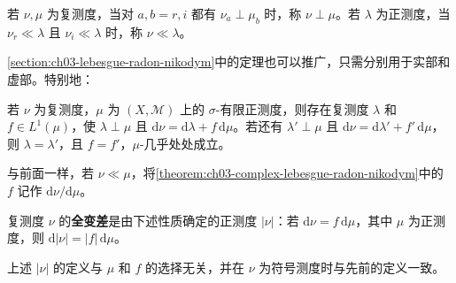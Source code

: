 \documentclass[../../main.tex]{subfiles}%
\begin{document}
\begin{definition}[复测度的奇异性与绝对连续性]\label{definition:ch03-complex-singular-absolute}
若 $\nu,\mu$ 为复测度，当对 $a,b=r,i$ 都有 $\nu_a\perp\mu_b$ 时，称 $\nu\perp\mu$。若 $\lambda$ 为正测度，当 $\nu_r\ll\lambda$ 且 $\nu_i\ll\lambda$ 时，称 $\nu\ll\lambda$。
\end{definition}
\cref{section:ch03-lebesgue-radon-nikodym}中的定理也可以推广，只需分别用于实部和虚部。特别地：
\begin{theorem}\label{theorem:ch03-complex-lebesgue-radon-nikodym}
若 $\nu$ 为复测度，$\mu$ 为 $(X,\mathscr{M})$ 上的 $\sigma$-有限正测度，则存在复测度 $\lambda$ 和 $f\in L^1(\mu)$，使 $\lambda\perp\mu$ 且 $\mathrm{d}\nu=\mathrm{d}\lambda+f\,\mathrm{d}\mu$。若还有 $\lambda'\perp\mu$ 且 $\mathrm{d}\nu=\mathrm{d}\lambda'+f'\,\mathrm{d}\mu$，则 $\lambda=\lambda'$，且 $f=f'$，$\mu$-几乎处处成立。
\end{theorem}
\begin{definition}\label{definition:ch03-complex-radon-nikodym}
与前面一样，若 $\nu\ll\mu$，将\cref{theorem:ch03-complex-lebesgue-radon-nikodym}中的 $f$ 记作 $\mathrm{d}\nu/\mathrm{d}\mu$。
\end{definition}
\begin{definition}[复测度的全变差]\label{definition:ch03-complex-total-variation}
复测度 $\nu$ 的\textbf{全变差}是由下述性质确定的正测度 $|\nu|$：若 $\mathrm{d}\nu=f\,\mathrm{d}\mu$，其中 $\mu$ 为正测度，则 $\mathrm{d}|\nu|=|f|\,\mathrm{d}\mu$。
\end{definition}
\begin{proposition}\label{proposition:ch03-complex-total-variation-well-defined}
上述 $|\nu|$ 的定义与 $\mu$ 和 $f$ 的选择无关，并在 $\nu$ 为符号测度时与先前的定义一致。
\end{proposition}
\end{document}
